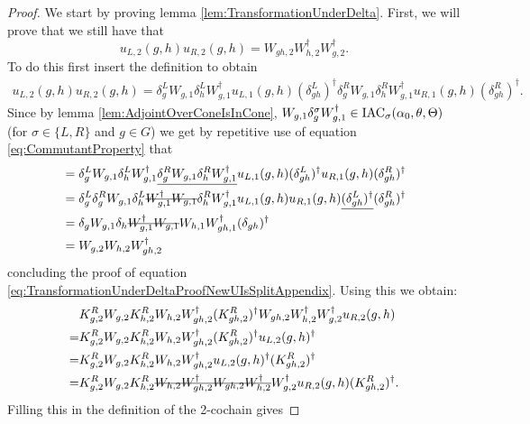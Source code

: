 \documentclass[11pt,a4paper,twoside]{article}
\numberwithin{equation}{section}
\begin{document}
	\begin{proof}
		We start by proving lemma \ref{lem:TransformationUnderDelta}. First, we will prove that we still have that
		\begin{equation}\label{eq:TransformationUnderDeltaProofNewUIsSplitAppendix}
			u_{L,2}(g,h)u_{R,2}(g,h)=W_{gh,2}W_{h,2}^\dagger W_{g,2}^\dagger.
		\end{equation}
		To do this first insert the definition to obtain
		\begin{align}
			u_{L,2}(g,h)u_{R,2}(g,h)=\delta_g^L W_{g,1}\delta_h^L W_{g,1}^\dagger u_{L,1}(g,h)(\delta_{gh}^L)^\dagger \delta_g^R W_{g,1}\delta_h^R W_{g,1}^\dagger u_{R,1}(g,h)(\delta_{gh}^R)^\dagger.
		\end{align}
		Since by lemma \ref{lem:AdjointOverConeIsInCone}, $ W_{g,1}\delta_g^\sigma W_{g,1}^\dagger\in\textrm{IAC}_\sigma(\alpha_0,\theta,\Theta)$ (for $\sigma\in\{L,R\}$ and $g\in G$) we get by repetitive use of equation \eqref{eq:CommutantProperty} that
		\begin{align}
			&=\delta_g^L W_{g,1}\delta_h^L W_{g,1}^\dagger \underline{\delta_g^R W_{g,1}\delta_h^R W_{g,1}^\dagger} u_{L,1}(g,h)(\delta_{gh}^L)^\dagger  u_{R,1}(g,h)(\delta_{gh}^R)^\dagger\\
			&=\delta_g^L \delta_g^R W_{g,1}\delta_h^L \stkout{ W_{g,1}^\dagger W_{g,1}}\delta_h^R W_{g,1}^\dagger u_{L,1}(g,h)  u_{R,1}(g,h)\underline{(\delta_{gh}^L)^\dagger}(\delta_{gh}^R)^\dagger\\
			&=\delta_g W_{g,1}\delta_h \stkout{W_{g,1}^\dagger W_{g,1}} W_{h,1} W_{gh,1}^\dagger(\delta_{gh})^\dagger\\
			&=W_{g,2}W_{h,2}W_{gh,2}^\dagger
		\end{align}
		concluding the proof of equation \eqref{eq:TransformationUnderDeltaProofNewUIsSplitAppendix}. Using this we obtain:
		\begin{align}
			&K_{g,2}^RW_{g,2}K_{h,2}^{R}W_{h,2}W_{gh,2}^\dagger(K_{gh,2}^R)^\dagger W_{gh,2}W_{h,2}^\dagger W_{g,2}^\dagger u_{R,2}(g,h)\\
			=&K_{g,2}^RW_{g,2}K_{h,2}^{R}W_{h,2}W_{gh,2}^\dagger(K_{gh,2}^R)^\dagger u_{L,2}(g,h)^\dagger\\
			=&K_{g,2}^RW_{g,2}K_{h,2}^{R}W_{h,2}W_{gh,2}^\dagger u_{L,2}(g,h)^\dagger (K_{gh,2}^R)^\dagger\\
			=&K_{g,2}^RW_{g,2}K_{h,2}^{R}\stkout{W_{h,2}W_{gh,2}^\dagger W_{gh,2}W_{h,2}^\dagger} W_{g,2}^\dagger u_{R,2}(g,h) (K_{gh,2}^R)^\dagger.
		\end{align}
		Filling this in the definition of the 2-cochain gives

\end{proof}
\end{document}
